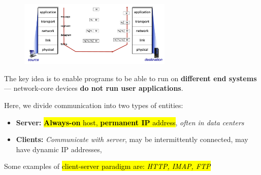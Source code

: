 \documentclass[12pt,a4paper]{article}
\begin{document}

\vspace{-1.0em}\begin{figure}[h]
    \centering
    \includegraphics[width=0.65\textwidth]{ch1_img/encapsulation.png}
\end{figure}

\begin{tcolorbox}[colframe=green!60!blue, colback=green!20, title=\section*{Chapter 2 Summary}]
\end{tcolorbox}


\noindent The key idea is to enable programs to be able to run on \textbf{different end systems} --- network-core devices \textbf{do not run user applications}. \\


\noindent Here, we divide communication into two types of entities:

\vspace{0.5em}\begin{itemize}
  \item \textbf{Server:} \hl{\textbf{Always-on} host, \textbf{permanent IP} address}, \textit{often in data centers}
  \item \textbf{Clients:} \textit{Communicate with server}, may be intermittently connected, may have dynamic IP addresses, 
\end{itemize}

\noindent Some examples of \hl{client-server paradigm are: \textit{HTTP, IMAP, FTP}} \\
\end{document}
